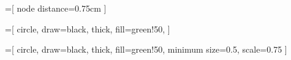 
  
\usetikzlibrary{positioning}
\usetikzlibrary{shapes.geometric}
\usetikzlibrary{arrows}
\usetikzlibrary{arrows.meta}
\usetikzlibrary{fit}
\usetikzlibrary{calc}
\usetikzlibrary{matrix}
\usetikzlibrary{graphs, graphs.standard, quotes}
\usetikzlibrary{babel}

=[
	node distance=0.75cm
]


=[
	circle, 
	draw=black,
	thick,
	fill=green!50,
]

=[
circle, 
draw=black,
thick,
fill=green!50,
minimum size=0.5,
scale=0.75
]